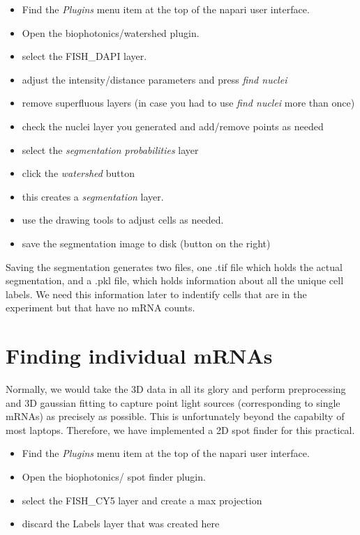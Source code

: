 \documentclass[11pt]{article} %
\begin{document}
\begin{itemize}
\item Find the {\it Plugins} menu item at the top of the napari user interface. 
\item Open the biophotonics/watershed plugin.
\item select the FISH\_DAPI layer.
\item adjust the intensity/distance parameters and press {\it find nuclei}
\item remove superfluous layers (in case you had to use {\it find nuclei} more than once)
\item check the nuclei layer you generated and add/remove points as needed
\item select the {\it segmentation probabilities} layer
\item click the {\it watershed} button
\item this creates a {\it segmentation} layer. 
\item use the drawing tools to adjust cells as needed. 
\item save the segmentation image to disk (button on the right)
\end{itemize}

Saving the segmentation generates two files, one .tif file which holds the actual segmentation, and a .pkl file, which holds information about all the unique cell labels. We need this information later to indentify cells that are in the experiment but that have no 
mRNA counts. 

\section{Finding individual mRNAs}
Normally, we would take the 3D data in all its glory and perform preprocessing and 3D gaussian fitting to capture point light sources (corresponding to single mRNAs) as precisely as possible. 
This is unfortunately beyond the capabilty of most laptops.
Therefore, we have implemented a 2D spot finder for this practical.
\begin{itemize}
\item Find the {\it Plugins} menu item at the top of the napari user interface. 
\item Open the biophotonics/ spot finder plugin.
\item select the FISH\_CY5 layer and create a max projection
\item discard the Labels layer that was created here
\end{itemize}
\end{document}
